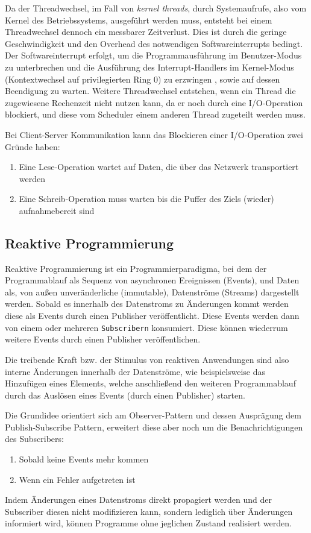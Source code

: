 \noindent
Da der Threadwechsel, im Fall von \textit{kernel threads}, durch Systemaufrufe, also vom Kernel des Betriebssystems, ausgeführt werden muss, entsteht
bei einem Threadwechsel dennoch ein messbarer Zeitverlust.
Dies ist durch die geringe Geschwindigkeit und den Overhead des notwendigen Softwareinterrupts bedingt.
Der Softwareinterrupt erfolgt, um die Programmausführung im Benutzer-Modus zu unterbrechen und die Ausführung des Interrupt-Handlers im
Kernel-Modus (Kontextwechsel auf privilegierten Ring 0) zu erzwingen , sowie auf dessen Beendigung zu warten.
Weitere Threadwechsel entstehen, wenn ein Thread die zugewiesene Rechenzeit nicht nutzen kann, da er noch durch eine I/O-Operation
blockiert, und diese vom Scheduler einem anderen Thread zugeteilt werden muss.

\noindent
Bei Client-Server Kommunikation kann das Blockieren einer I/O-Operation zwei Gründe haben:
\begin{enumerate}
	\item Eine Lese-Operation wartet auf Daten, die über das Netzwerk transportiert werden
	\item Eine Schreib-Operation muss warten bis die Puffer des Ziels (wieder) aufnahmebereit sind
\end{enumerate}
\noindent



\subsection{Reaktive Programmierung}
\label{section:reaktive_programmierung}
Reaktive Programmierung ist ein Programmierparadigma, bei dem der Programmablauf als Sequenz von asynchronen Ereignissen (Events), und
Daten als, von außen unveränderliche (immutable), Datenströme (Streams) dargestellt werden.
Sobald es innerhalb des Datenstroms zu Änderungen kommt werden diese als Events durch einen Publisher veröffentlicht.
Diese Events werden dann von einem oder mehreren \verb|Subscribern| konsumiert. Diese können wiederrum weitere Events durch einen Publisher veröffentlichen.

Die treibende Kraft bzw. der Stimulus von reaktiven Anwendungen sind also interne Änderungen innerhalb der Datenströme, wie beispielsweise das
Hinzufügen eines Elements, welche anschließend den weiteren Programmablauf durch das Auslösen eines Events (durch einen Publisher) starten.

Die Grundidee orientiert sich am Observer-Pattern und dessen Ausprägung dem Publish-Subscribe Pattern, erweitert diese aber
noch um die Benachrichtigungen des Subscribers:
\begin{enumerate}
	\item Sobald keine Events mehr kommen
	\item Wenn ein Fehler aufgetreten ist
\end{enumerate}
Indem Änderungen eines Datenstroms direkt propagiert werden und der Subscriber diesen nicht modifizieren kann, sondern lediglich über Änderungen informiert wird,
können Programme ohne jeglichen Zustand realisiert werden\parencite{Escoffier2017}.

